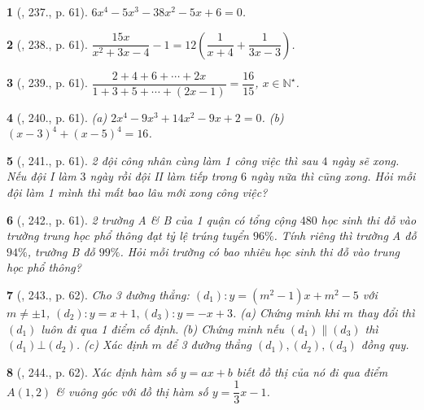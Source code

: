 \documentclass{article}
\newtheorem{baitoan}{}
\begin{document}
\begin{baitoan}[\cite{Tuyen_Toan_8}, 237., p. 61]
	$6x^4 - 5x^3 - 38x^2 - 5x + 6 = 0$.
\end{baitoan}

\begin{baitoan}[\cite{Tuyen_Toan_8}, 238., p. 61]
	$\dfrac{15x}{x^2 + 3x - 4} - 1 = 12\left(\dfrac{1}{x + 4} + \dfrac{1}{3x - 3}\right)$.
\end{baitoan}

\begin{baitoan}[\cite{Tuyen_Toan_8}, 239., p. 61]
	$\dfrac{2 + 4 + 6 + \cdots + 2x}{1 + 3 + 5 + \cdots + (2x - 1)} = \dfrac{16}{15}$, $x\in\mathbb{N}^\star$.
\end{baitoan}

\begin{baitoan}[\cite{Tuyen_Toan_8}, 240., p. 61]
	(a) $2x^4 - 9x^3 + 14x^2 - 9x + 2 = 0$. (b) $(x - 3)^4 + (x - 5)^4 = 16$.
\end{baitoan}

\begin{baitoan}[\cite{Tuyen_Toan_8}, 241., p. 61]
	2 đội công nhân cùng làm 1 công việc thì sau $4$ ngày sẽ xong. Nếu đội I làm $3$ ngày rồi đội II làm tiếp trong $6$ ngày nữa thì cũng xong. Hỏi mỗi đội làm 1 mình thì mất bao lâu mới xong công việc?
\end{baitoan}

\begin{baitoan}[\cite{Tuyen_Toan_8}, 242., p. 61]
	2 trường A \& B của 1 quận có tổng cộng $480$ học sinh thi đỗ vào trường trung học phổ thông đạt tỷ lệ trúng tuyển $96\%$. Tính riêng thì trường A đỗ $94\%$, trường B đỗ $99\%$. Hỏi mỗi trường có bao nhiêu học sinh thi đỗ vào trung học phổ thông?
\end{baitoan}

\begin{baitoan}[\cite{Tuyen_Toan_8}, 243., p. 62]
	Cho 3 đường thẳng: $(d_1):y = (m^2 - 1)x + m^2 - 5$ với $m\ne\pm1$, $(d_2):y = x + 1,(d_3):y = -x + 3$. (a) Chứng minh khi $m$ thay đổi thì $(d_1)$ luôn đi qua 1 điểm cố định. (b) Chứng minh nếu $(d_1)\parallel(d_3)$ thì $(d_1)\bot(d_2)$. (c) Xác định $m$ để 3 đường thẳng $(d_1),(d_2),(d_3)$ đồng quy.
\end{baitoan}

\begin{baitoan}[\cite{Tuyen_Toan_8}, 244., p. 62]
	Xác định hàm số $y = ax + b$ biết đồ thị của nó đi qua điểm $A(1,2)$ \& vuông góc với đồ thị hàm số $y = \dfrac{1}{3}x - 1$.
\end{baitoan}
\end{document}

